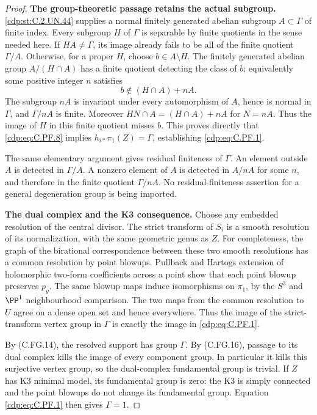 \begin{proof}
\par\medskip\noindent\textbf{The group-theoretic passage retains the actual subgroup.}
\ref{cdp:st:C.2.UN.44} supplies a normal finitely generated abelian subgroup
$A\subset\Gamma$ of finite index. Every subgroup $H$ of $\Gamma$
is separable by finite quotients in the sense needed here.
If $HA\ne\Gamma$, its image already fails to be all of
the finite quotient $\Gamma/A$. Otherwise, for a proper
$H$, choose $b\in A\setminus H$. The finitely generated
abelian group $A/(H\cap A)$ has a finite quotient detecting
the class of $b$; equivalently some positive integer $n$
satisfies
\[
                         b\notin(H\cap A)+nA .
                                                        \tag{C.PF.9}\label{cdp:eq:C.PF.9}
\]
The subgroup $nA$ is invariant under every automorphism of $A$,
hence is normal in $\Gamma$, and $\Gamma/nA$ is finite.
Moreover $HN\cap A=(H\cap A)+nA$ for $N=nA$.
Thus the image of $H$ in this finite quotient misses $b$.
This proves directly that \eqref{cdp:eq:C.PF.8} implies
$h_{i*}\pi_1(Z)=\Gamma$, establishing \eqref{cdp:eq:C.PF.1}.

The same elementary argument gives residual finiteness of
$\Gamma$. An element outside $A$ is detected in $\Gamma/A$.
A nonzero element of $A$ is detected in $A/nA$ for some $n$,
and therefore in the finite quotient $\Gamma/nA$.
No residual-finiteness assertion for a general degeneration
group is being imported.

\par\medskip\noindent\textbf{The dual complex and the K3 consequence.}
Choose any embedded resolution of the central divisor.
The strict transform of $S_i$ is a smooth resolution of its
normalization, with the same geometric genus as $Z$.
For completeness, the graph of the birational correspondence
between these two smooth resolutions has a common resolution
by point blowups. Pullback and Hartogs extension of holomorphic
two-form coefficients across a point show that each point blowup
preserves $p_g$. The same blowup maps induce isomorphisms on
$\pi_1$, by the $S^3$ and $\PP^1$ neighbourhood comparison.
The two maps from the common resolution to $U$ agree on a
dense open set and hence everywhere. Thus the image of the
strict-transform vertex group in $\Gamma$ is exactly the
image in \eqref{cdp:eq:C.PF.1}.

By (C.FG.14), the resolved support has group $\Gamma$.
By (C.FG.16), passage to its dual complex kills the image of
every component group. In particular it kills this surjective
vertex group, so the dual-complex fundamental group is trivial.
If $Z$ has K3 minimal model, its fundamental group is zero:
the K3 is simply connected and the point blowups do not change
its fundamental group. Equation \eqref{cdp:eq:C.PF.1} then gives $\Gamma=1$.


\end{proof}

